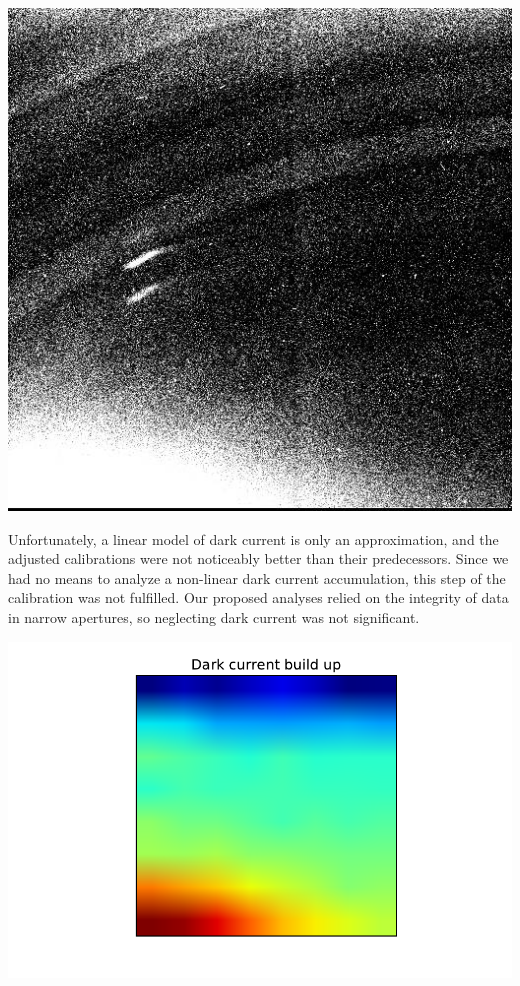 \documentclass[useAMS,usenatbib]{mn2e}
\begin{document}
\vspace{15mm}
\includegraphics[width=\linewidth]{M82-60min.jpg}

Unfortunately, a linear model of dark current is only an approximation, and the adjusted calibrations were not noticeably better than their predecessors. Since we had no means to analyze a non-linear dark current accumulation, this step of the calibration was not fulfilled. Our proposed analyses relied on the integrity of data in narrow apertures, so neglecting dark current was not significant.


\includegraphics[width=\linewidth]{dark-current-buildup.pdf}
\end{document}
